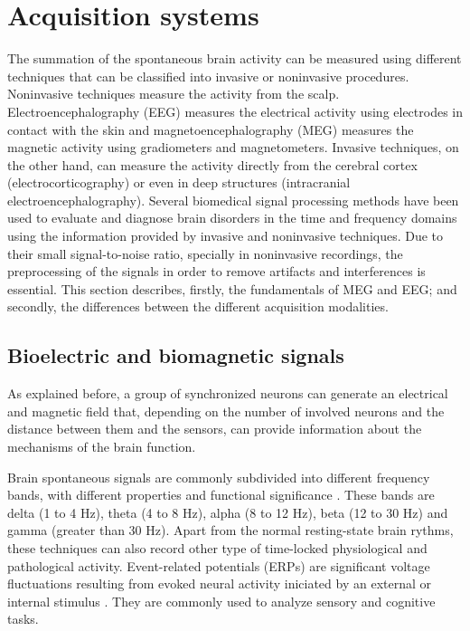 	\section{Acquisition systems} 
    \label{section:EEGMEG}
    The summation of the spontaneous brain activity can be measured using different techniques that can be classified into invasive or noninvasive procedures. Noninvasive techniques measure the activity from the scalp. Electroencephalography (EEG) measures the electrical activity using electrodes in contact with the skin and magnetoencephalography (MEG) measures the magnetic activity using gradiometers and magnetometers. Invasive techniques, on the other hand, can measure the activity directly from the cerebral cortex (electrocorticography) or even in deep structures (intracranial electroencephalography). Several biomedical signal processing methods have been used to evaluate and diagnose brain disorders in the time and frequency domains \citep{Sornmo2005} using the information provided by invasive and noninvasive techniques. Due to their small signal-to-noise ratio, specially in noninvasive recordings, the preprocessing of the signals in order to remove artifacts and interferences is essential. This section describes, firstly, the fundamentals of MEG and EEG; and secondly, the differences between the different acquisition modalities.
    
      \subsection{Bioelectric and biomagnetic signals}
As explained before, a group of synchronized neurons can generate an electrical and magnetic field that, depending on the number of involved neurons and the distance between them and the sensors, can provide information about the mechanisms of the brain function. 
        
Brain spontaneous signals are commonly subdivided into different frequency bands, with different properties and functional significance \citep{Huang2016}. These bands are delta (1 to 4 Hz), theta (4 to 8 Hz), alpha (8 to 12 Hz), beta (12 to 30 Hz) and gamma (greater than 30 Hz). Apart from the normal resting-state brain rythms, these techniques can also record other type of time-locked physiological and pathological activity. Event-related potentials (ERPs) are significant voltage fluctuations resulting from evoked neural activity iniciated by an external or internal stimulus \citep{Coles1996}. They are commonly used to analyze sensory and cognitive tasks. 
        
